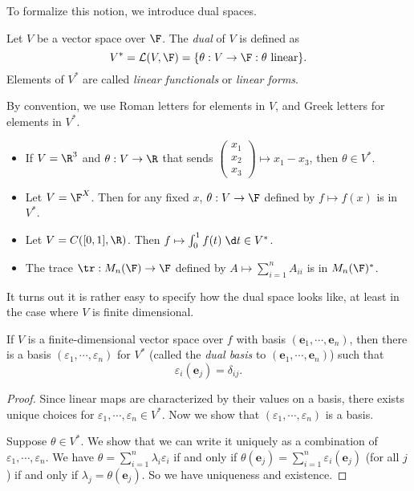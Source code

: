 \documentclass[a4paper]{article}
\begin{document}
To formalize this notion, we introduce dual spaces.

\begin{defi}
  Let $V$ be a vector space over $\F$. The \emph{dual} of $V$ is defined as
  \[
    V^* = \mathcal{L}(V, \F) = \{\theta: V \to \F: \theta\text{ linear}\}.
  \]
  Elements of $V^*$ are called \emph{linear functionals} or \emph{linear forms}.
\end{defi}
By convention, we use Roman letters for elements in $V$, and Greek letters for elements in $V^*$.

\begin{eg}\leavevmode
  \begin{itemize}
    \item If $V = \R^3$ and $\theta: V\to \R$ that sends $\begin{pmatrix}x_1\\x_2\\x_3\end{pmatrix} \mapsto x_1 - x_3$, then $\theta \in V^*$.
    \item Let $V = \F^X$. Then for any fixed $x$, $\theta: V\to \F$ defined by $f \mapsto f(x)$ is in $V^*$.
    \item Let $V = C([0, 1], \R)$. Then $f \mapsto \int_0^1 f(t)\;\d t \in V^*$.
    \item The trace $\tr: M_n(\F)\to \F$ defined by $A\mapsto \sum_{i = 1}^n A_{ii}$ is in $M_n(\F)^*$.
  \end{itemize}
\end{eg}

It turns out it is rather easy to specify how the dual space looks like, at least in the case where $V$ is finite dimensional.
\begin{lemma}
  If $V$ is a finite-dimensional vector space over $f$ with basis $(\mathbf{e}_1, \cdots, \mathbf{e}_n)$, then there is a basis $(\varepsilon_1, \cdots, \varepsilon_n)$ for $V^*$ (called the \emph{dual basis} to $(\mathbf{e}_1, \cdots, \mathbf{e}_n)$) such that
  \[
    \varepsilon_i(\mathbf{e}_j) = \delta_{ij}.
  \]
\end{lemma}

\begin{proof}
  Since linear maps are characterized by their values on a basis, there exists unique choices for $\varepsilon_1, \cdots, \varepsilon_n \in V^*$. Now we show that $(\varepsilon_1, \cdots, \varepsilon_n)$ is a basis.

  Suppose $\theta \in V^*$. We show that we can write it uniquely as a combination of $\varepsilon_1, \cdots, \varepsilon_n$. We have $\theta = \sum_{i = 1}^n \lambda_i \varepsilon_i$ if and only if $\theta(\mathbf{e}_j) = \sum_{i = 1}^n \varepsilon_i(\mathbf{e}_j)$ (for all $j$) if and only if $\lambda_j = \theta(\mathbf{e}_j)$. So we have uniqueness and existence.
\end{proof}
\end{document}
